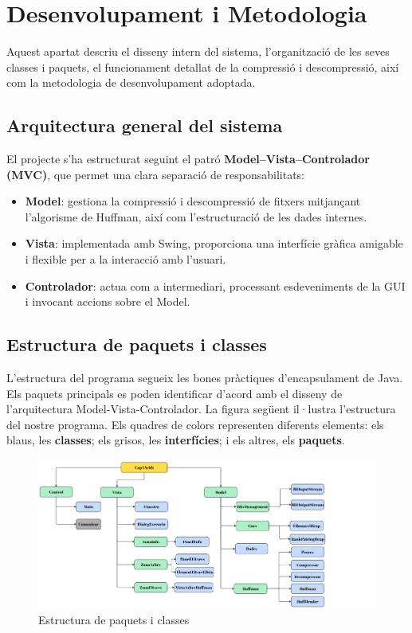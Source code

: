 \documentclass{ieeetj}
\begin{document}
\section{Desenvolupament i Metodologia}
Aquest apartat descriu el disseny intern del sistema, l'organització de les seves classes i paquets, el funcionament detallat de la compressió i descompressió, així com la metodologia de desenvolupament adoptada.

\subsection{Arquitectura general del sistema}

El projecte s'ha estructurat seguint el patró \textbf{Model–Vista–Controlador (MVC)}, que permet una clara separació de responsabilitats:
\begin{itemize}
    \item \textbf{Model}: gestiona la compressió i descompressió de fitxers mitjançant l'algorisme de Huffman, així com l'estructuració de les dades internes.
    \item \textbf{Vista}: implementada amb Swing, proporciona una interfície gràfica amigable i flexible per a la interacció amb l'usuari.
    \item \textbf{Controlador}: actua com a intermediari, processant esdeveniments de la GUI i invocant accions sobre el Model.
\end{itemize}

\subsection{Estructura de paquets i classes}

L'estructura del programa segueix les bones pràctiques d'encapsulament de Java. 
Els paquets principals es poden identificar d'acord amb el disseny de l'arquitectura Model-Vista-Controlador. 
La figura següent il·lustra l'estructura del nostre programa. \newline
Els quadres de colors representen diferents elements: \textcolor{blau}{els blaus}, les \textbf{classes}; \textcolor{gris}{els grisos}, les \textbf{interfícies};\textcolor{verd}{ i els altres}, els \textbf{paquets}.


\begin{figure}[H]
    \centering
    \includegraphics[width=\linewidth, keepaspectratio]{png/estructura.jpg}
    \caption{Estructura de paquets i classes}
    \label{fig:enter-label}
\end{figure}
\end{document}
